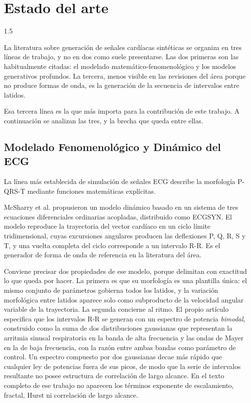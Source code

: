 \section{Estado del arte}
\label{sec:mapeo}
\begin{spacing}{1.5}

La literatura sobre generación de señales cardíacas sintéticas se organiza en tres líneas de trabajo, y no en dos como suele presentarse. Las dos primeras son las habitualmente citadas: el modelado matemático-fenomenológico y los modelos generativos profundos. La tercera, menos visible en las revisiones del área porque no produce formas de onda, es la generación de la secuencia de intervalos entre latidos.

Esa tercera línea es la que más importa para la contribución de este trabajo. A continuación se analizan las tres, y la brecha que queda entre ellas.

\subsection{Modelado Fenomenológico y Dinámico del ECG}

La línea más establecida de simulación de señales ECG describe la morfología P-QRS-T mediante funciones matemáticas explícitas.

McSharry et al. \cite{mcsharry2003dynamical} propusieron un modelo dinámico basado en un sistema de tres ecuaciones diferenciales ordinarias acopladas, distribuido como ECGSYN. El modelo reproduce la trayectoria del vector cardíaco en un ciclo límite tridimensional, cuyas excursiones angulares producen las deflexiones P, Q, R, S y T, y una vuelta completa del ciclo corresponde a un intervalo R-R. Es el generador de forma de onda de referencia en la literatura del área.

Conviene precisar dos propiedades de ese modelo, porque delimitan con exactitud lo que queda por hacer. La primera es que su morfología es una plantilla única: el mismo conjunto de parámetros gobierna todos los latidos, y la variación morfológica entre latidos aparece solo como subproducto de la velocidad angular variable de la trayectoria. La segunda concierne al ritmo. El propio artículo especifica que los intervalos R-R se generan con un espectro de potencia \emph{bimodal}, construido como la suma de dos distribuciones gaussianas que representan la arritmia sinusal respiratoria en la banda de alta frecuencia y las ondas de Mayer en la de baja frecuencia, con la razón entre ambas bandas como parámetro de control. Un espectro compuesto por dos gaussianas decae más rápido que cualquier ley de potencias fuera de sus picos, de modo que la serie de intervalos resultante no posee estructura de correlación de largo alcance. En el texto completo de ese trabajo no aparecen los términos exponente de escalamiento, fractal, Hurst ni correlación de largo alcance.


\end{spacing}
